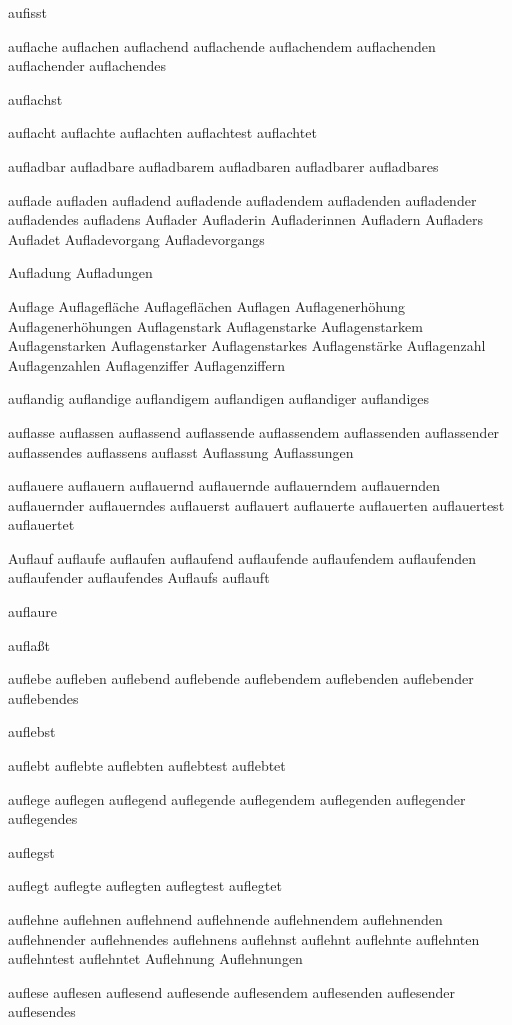 aufisst

auflache auflachen auflachend auflachende auflachendem auflachenden auflachender auflachendes

auflachst

auflacht auflachte auflachten auflachtest auflachtet

aufladbar aufladbare aufladbarem aufladbaren aufladbarer aufladbares

auflade aufladen aufladend aufladende aufladendem aufladenden aufladender aufladendes aufladens Auflader Aufladerin Aufladerinnen Aufladern Aufladers Aufladet Aufladevorgang Aufladevorgangs

Aufladung Aufladungen

Auflage Auflagefläche Auflageflächen Auflagen Auflagenerhöhung Auflagenerhöhungen Auflagenstark Auflagenstarke Auflagenstarkem Auflagenstarken Auflagenstarker Auflagenstarkes Auflagenstärke Auflagenzahl Auflagenzahlen Auflagenziffer Auflagenziffern

auflandig auflandige auflandigem auflandigen auflandiger auflandiges

auflasse auflassen auflassend auflassende auflassendem auflassenden auflassender auflassendes auflassens auflasst Auflassung Auflassungen

auflauere auflauern auflauernd auflauernde auflauerndem auflauernden auflauernder auflauerndes auflauerst auflauert auflauerte auflauerten auflauertest auflauertet

Auflauf auflaufe auflaufen auflaufend auflaufende auflaufendem auflaufenden auflaufender auflaufendes Auflaufs auflauft

auflaure

auflaßt

auflebe aufleben auflebend auflebende auflebendem auflebenden auflebender auflebendes

auflebst

auflebt auflebte auflebten auflebtest auflebtet

auflege auflegen auflegend auflegende auflegendem auflegenden auflegender auflegendes

auflegst

auflegt auflegte auflegten auflegtest auflegtet

auflehne auflehnen auflehnend auflehnende auflehnendem auflehnenden auflehnender auflehnendes auflehnens auflehnst auflehnt auflehnte auflehnten auflehntest auflehntet Auflehnung Auflehnungen

auflese auflesen auflesend auflesende auflesendem auflesenden auflesender auflesendes

